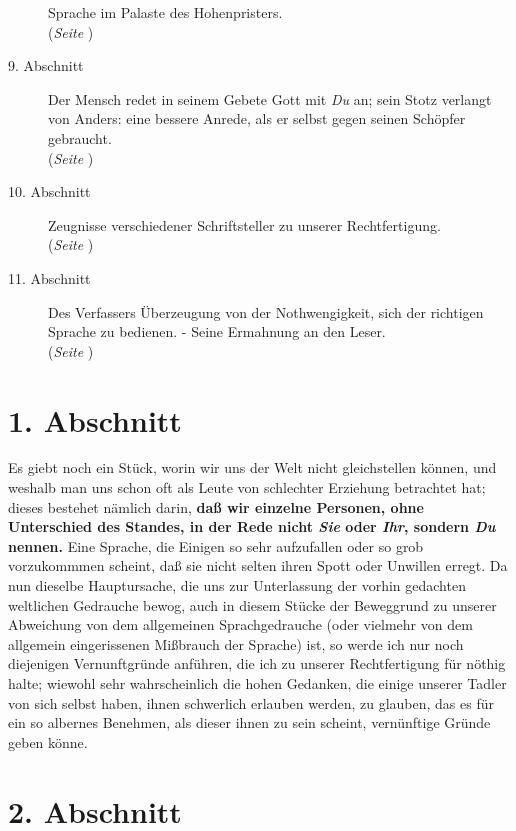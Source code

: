 \begin{description}
Sprache im Palaste des Hohenpristers.
\\(\textit{Seite \pageref{kap10_ab8}})
\item[9. Abschnitt] Der Mensch redet in seinem Gebete Gott mit \textit{Du} an; sein
Stotz verlangt von Anders: eine bessere Anrede, als er selbst gegen seinen
Schöpfer gebraucht.
\\(\textit{Seite \pageref{kap10_ab9}})
\item[10. Abschnitt] Zeugnisse verschiedener Schriftsteller zu unserer
Rechtfertigung.
\\(\textit{Seite \pageref{kap10_ab10}})
\item[11. Abschnitt] Des Verfassers Überzeugung von der Nothwengigkeit, sich
der richtigen Sprache zu bedienen. - Seine Ermahnung an den Leser.
\\(\textit{Seite \pageref{kap10_ab11}})

\end{description}

\newpage

\section{1. Abschnitt} \label{kap10_ab1}

Es giebt noch ein Stück, worin wir uns der Welt nicht gleichstellen können, und
weshalb man uns schon oft als Leute von schlechter Erziehung betrachtet hat;
dieses bestehet nämlich darin, \textbf{daß wir einzelne Personen, ohne Unterschied des
Standes, in der Rede nicht \textit{Sie} oder \textit{Ihr}, sondern \textit{Du} nennen.} Eine
Sprache, die Einigen so sehr aufzufallen oder so grob vorzukommmen scheint, daß
sie nicht selten ihren Spott oder Unwillen erregt. Da nun dieselbe Hauptursache,
die uns zur Unterlassung der vorhin gedachten weltlichen Gedrauche bewog, auch
in diesem Stücke der Beweggrund zu unserer Abweichung von dem allgemeinen
Sprachgedrauche (oder vielmehr von dem allgemein eingerissenen Mißbrauch der
Sprache) ist, so werde ich nur noch diejenigen Vernunftgründe anführen, die ich
zu unserer Rechtfertigung für nöthig halte; wiewohl sehr wahrscheinlich die
hohen Gedanken, die einige unserer Tadler von sich selbst haben, ihnen
schwerlich erlauben werden, zu glauben, das es für ein so albernes Benehmen, als
dieser ihnen zu sein scheint, vernünftige Gründe geben könne.

\section{2. Abschnitt} \label{kap10_ab2}

